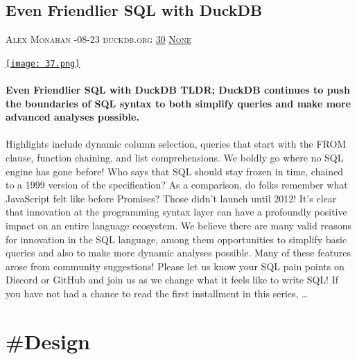 \documentclass[10pt,a4paper]{article}
\begin{document}
\begin{multicols}{2}
\begin{minipage}{\linewidth}
\subsection{Even Friendlier SQL with DuckDB}
\textsc{\footnotesize
{\scriptsize\faUser}\space 
Alex Monahan 
{\scriptsize\faCalendar}-08-23 
{\scriptsize\faGlobe}\space 
duckdb.org 
{\scriptsize\faThumbsOUp}\space 
\href{http://news.ycombinator.com/item?id=37262493\&utm\_term=comment}{30} 
{\scriptsize\faComments}\space 
\href{http://news.ycombinator.com/item?id=37262493\&utm\_term=comment}{None} 
}
\par\medskip\noindent
\href{https://duckdb.org/2023/08/23/even-friendlier-sql.html?utm\_source=hackernewsletter\&utm\_medium=email\&utm\_term=data}{
    \texttt{[image: 37.png]}
}
\end{minipage}
\paragraph{}
\textbf{Even Friendlier SQL with DuckDB
TLDR; DuckDB continues to push the boundaries of SQL syntax to both simplify queries and make more advanced analyses possible.}
\paragraph{}
 Highlights include dynamic column selection, queries that start with the FROM clause, function chaining, and list comprehensions. We boldly go where no SQL engine has gone before!
Who says that SQL should stay frozen in time, chained to a 1999 version of the specification? As a comparison, do folks remember what JavaScript felt like before Promises? Those didn’t launch until 2012! It’s clear that innovation at the programming syntax layer can have a profoundly positive impact on an entire language ecosystem.
We believe there are many valid reasons for innovation in the SQL language, among them opportunities to simplify basic queries and also to make more dynamic analyses possible. Many of these features arose from community suggestions! Please let us know your SQL pain points on Discord or GitHub and join us as we change what it feels like to write SQL!
If you have not had a chance to read the first installment in this series, 
\dots\par
\end{multicols}

\newpage
\section{\#Design}
\end{document}
